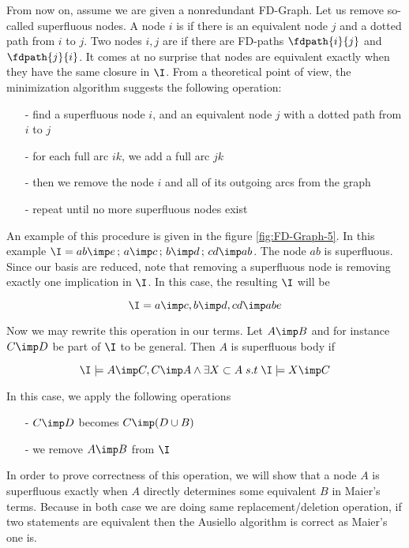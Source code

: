 From now on, assume we are given a nonredundant FD-Graph. Let us remove so-called superfluous nodes. A node $i$ is  if there is an equivalent node $j$ and a dotted path from $i$ to $j$. Two nodes $i, j$ are  if there are FD-paths $\fdpath{i}{j}$ and $\fdpath{j}{i}$.
It comes at no surprise that nodes are equivalent exactly when they have the
same closure in $\I$. From a theoretical point of view, the minimization algorithm suggests the following operation:
\begin{itemize}
	\item[-] find a superfluous node $i$, and an equivalent node $j$ with a dotted
	path from $i$ to $j$
	\item[-] for each full arc $ik$, we add a full arc $jk$
	\item[-] then we remove the node $i$ and all of its outgoing arcs from the 
	graph
	\item[-] repeat until no more superfluous nodes exist
\end{itemize}
\noindent An example of this procedure is given in the figure
\ref{fig:FD-Graph-5}. In this example $\I = {ab \imp e \, ; \, a \imp c
	\, ; \, b \imp d \, ; \, cd \imp ab}$. The node $ab$ is superfluous. Since 
our
basis are reduced, note that removing a superfluous node is removing exactly 
one implication in $\I$. In this case, the resulting $\I$ will be

\[ \I = {a \imp c, b \imp d, cd \imp abe} \] 


\begin{figure}[ht]

\end{figure}


\noindent Now we may rewrite this operation in our terms. Let $A \imp B$ and 
for instance $C \imp D$ be part of $\I$ to be general. Then $A$ is superfluous
body if

\[ \I \models A \imp C, C \imp A \land \exists X \subset A \; s.t \;
\I \models X \imp C \]

\noindent In this case, we apply the following operations
\begin{itemize}
	\item[-] $C \imp D$ becomes $C \imp (D \cup B)$
	\item[-] we remove $A \imp B$ from $\I$
\end{itemize}

\noindent In order to prove correctness of this operation, we will show that
a node $A$ is superfluous exactly when $A$ directly determines some equivalent
$B$ in Maier's terms. Because in both case we are doing same replacement/deletion operation, if two statements are equivalent then the Ausiello algorithm is correct as Maier's one is.

